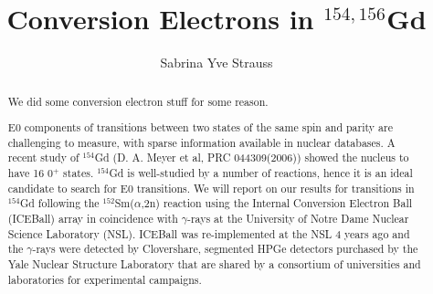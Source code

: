 \documentclass[final,numrefs,sort&compress,noinfo]{nddiss2e}
\begin{document}
\frontmatter %

\title{Conversion Electrons in $^{154,156}$Gd}
\author{Sabrina Yve Strauss}

\maketitle
%
%

\makecopyright

\begin{abstract}
  We did some conversion electron stuff for some reason.
  
  E0 components of transitions between two states of the same spin and parity are challenging to measure, with sparse information available in nuclear databases. A recent study of $^{154}$Gd (D. A. Meyer et al, PRC 044309(2006)) showed the nucleus to have 16 0$^+$ states. $^{154}$Gd is well-studied by a number of reactions, hence it is an ideal candidate to search for E0 transitions. We will report on our results for transitions in $^{154}$Gd following the $^{152}$Sm($\alpha$,2n) reaction using the Internal Conversion Electron Ball (ICEBall) array in coincidence with $\gamma$-rays at the University of Notre Dame Nuclear Science Laboratory (NSL). ICEBall was re-implemented at the NSL 4 years ago and the $\gamma$-rays were detected by Clovershare, segmented HPGe detectors purchased by the Yale Nuclear Structure Laboratory that are shared by a consortium of universities and laboratories for experimental campaigns.
\end{abstract}
\end{document}
